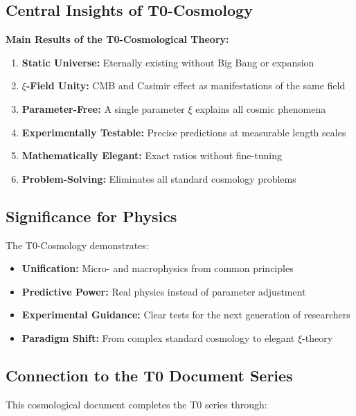 \documentclass[12pt,a4paper]{article}
\newcommand{\xipar}{\xi}
\begin{document}
	\subsection{Central Insights of T0-Cosmology}
	
	\begin{keyresult}
		\textbf{Main Results of the T0-Cosmological Theory:}
		
		\begin{enumerate}
			\item \textbf{Static Universe:} Eternally existing without Big Bang or expansion
			\item \textbf{$\xi$-Field Unity:} CMB and Casimir effect as manifestations of the same field
			\item \textbf{Parameter-Free:} A single parameter $\xipar$ explains all cosmic phenomena
			\item \textbf{Experimentally Testable:} Precise predictions at measurable length scales
			\item \textbf{Mathematically Elegant:} Exact ratios without fine-tuning
			\item \textbf{Problem-Solving:} Eliminates all standard cosmology problems
		\end{enumerate}
	\end{keyresult}
	
	\subsection{Significance for Physics}
	
	The T0-Cosmology demonstrates:
	
	\begin{itemize}
		\item \textbf{Unification:} Micro- and macrophysics from common principles
		\item \textbf{Predictive Power:} Real physics instead of parameter adjustment
		\item \textbf{Experimental Guidance:} Clear tests for the next generation of researchers
		\item \textbf{Paradigm Shift:} From complex standard cosmology to elegant $\xi$-theory
	\end{itemize}
	
	\subsection{Connection to the T0 Document Series}
	
	This cosmological document completes the T0 series through:
	
\end{document}
